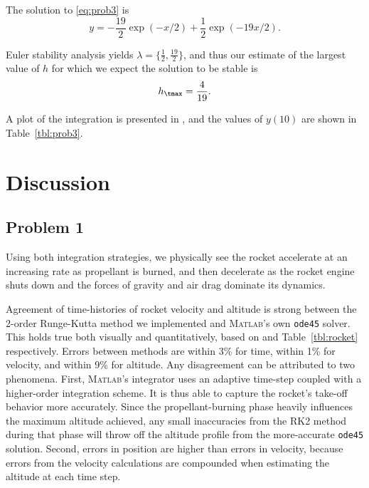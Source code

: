 \documentclass[12pt]{article}
\begin{document}
The solution to \eqref{eq:prob3} is
\begin{equation}
y = -\frac{19}{2} \exp(-x/2) + \frac{1}{2} \exp(-19x/2)
.
\label{eq:prob3_analytic}
\end{equation}

Euler stability analysis yields $\lambda = \{ \tfrac{1}{2}, \tfrac{19}{2} \}$, and thus our estimate of the largest value of $h$ for which we expect the solution to be stable is
\begin{equation}
h_\tmax = \frac{4}{19}
.
\end{equation}

A plot of the integration is presented in , and the values of $y(10)$ are shown in Table~\ref{tbl:prob3}.

\section{Discussion} %

\subsection*{Problem 1}

Using both integration strategies, we physically see the rocket accelerate at an increasing rate as propellant is burned, and then decelerate as the rocket engine shuts down and the forces of gravity and air drag dominate its dynamics. 

Agreement of time-histories of rocket velocity and altitude is strong between the 2\nd-order Runge-Kutta method we implemented and \textsc{Matlab}'s own \lstinline|ode45| solver. This holds true both visually and quantitatively, based on  and Table~\ref{tbl:rocket} respectively. Errors between methods are within 3\% for time, within 1\% for velocity, and within 9\% for altitude. Any disagreement can be attributed to two phenomena. First, \textsc{Matlab}'s integrator uses an adaptive time-step coupled with a higher-order integration scheme. It is thus able to capture the rocket's take-off behavior more accurately. Since the propellant-burning phase heavily influences the maximum altitude achieved, any small inaccuracies from the RK2 method during that phase will throw off the altitude profile from the more-accurate \lstinline|ode45| solution. Second, errors in position are higher than errors in velocity, because errors from the velocity calculations are compounded when estimating the altitude at each time step.
\end{document}

